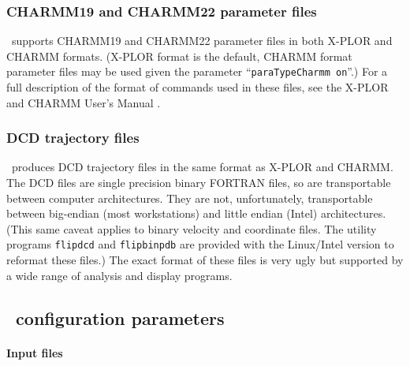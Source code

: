 \subsubsection{CHARMM19 and CHARMM22 parameter files}

\NAMD\ supports CHARMM19 and CHARMM22 parameter files in both
X-PLOR and CHARMM formats.
(X-PLOR format is the default, CHARMM format parameter files
may be used given the parameter ``{\tt paraTypeCharmm on}''.)
For a full description of the format of commands 
used in these files, see the X-PLOR and CHARMM User's Manual 
.  

\subsubsection{DCD trajectory files}

\NAMD\ produces DCD trajectory files in the same format as 
X-PLOR and CHARMM.  
The DCD files are single precision binary FORTRAN files, 
so are transportable between computer architectures.  
They are not, unfortunately, transportable between big-endian (most
workstations) and little endian (Intel) architectures.
(This same caveat applies to binary velocity and coordinate files.
The utility programs {\tt flipdcd} and {\tt flipbinpdb} are
provided with the Linux/Intel version to reformat these files.)
The exact format of these files is very ugly but supported by 
a wide range of analysis and display programs.  

\subsection{\NAMD\ configuration parameters}
\label{section:file_config}

\paragraph{Input files}


